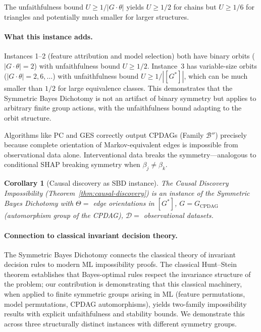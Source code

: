 \documentclass{article}
\newtheorem{corollary}[theorem]{Corollary}
\begin{document}
The unfaithfulness bound $U \geq 1/|G \cdot \theta|$ yields $U \geq 1/2$ for chains but $U \geq 1/6$ for triangles and potentially much smaller for larger structures.

\paragraph{What this instance adds.}
Instances 1--2 (feature attribution and model selection) both have binary orbits ($|G \cdot \theta| = 2$) with unfaithfulness bound $U \geq 1/2$. Instance~3 has variable-size orbits ($|G \cdot \theta| = 2, 6, \ldots$) with unfaithfulness bound $U \geq 1/|[G^*]|$, which can be much smaller than $1/2$ for large equivalence classes. This demonstrates that the Symmetric Bayes Dichotomy is not an artifact of binary symmetry but applies to arbitrary finite group actions, with the unfaithfulness bound adapting to the orbit structure.

Algorithms like PC and GES correctly output CPDAGs (Family $\mathcal{B}''$) precisely because complete orientation of Markov-equivalent edges is impossible from observational data alone. Interventional data breaks the symmetry---analogous to conditional SHAP breaking symmetry when $\beta_j \neq \beta_k$.

\begin{corollary}[Causal discovery as SBD instance]
\label{cor:causal-discovery-instance}
The Causal Discovery Impossibility (Theorem~\ref{thm:causal-discovery})
is an instance of the Symmetric Bayes Dichotomy with
$\Theta =$ edge orientations in $[G^*]$,
$G = G_{\text{CPDAG}}$ (automorphism group of the CPDAG),
$\mathcal{D} =$ observational datasets.
\end{corollary}

\paragraph{Connection to classical invariant decision theory.}
\begin{sloppypar}
The Symmetric Bayes Dichotomy connects the classical theory of invariant decision
rules \citep{lehmann2005testing,hunt1946} to modern ML impossibility proofs. The
classical Hunt--Stein theorem establishes that Bayes-optimal rules respect the
invariance structure of the problem; our contribution is demonstrating that this
classical machinery, when applied to finite symmetric groups arising in ML (feature
permutations, model permutations, CPDAG automorphisms), yields two-family
impossibility results with explicit unfaithfulness and stability bounds. We
demonstrate this across three structurally distinct instances with different
symmetry groups.
\end{sloppypar}
\end{document}

